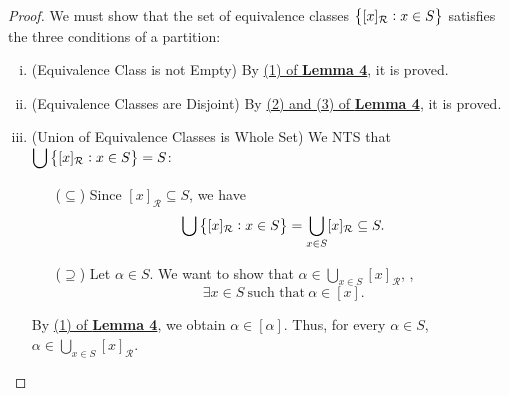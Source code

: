 \documentclass[11pt,openany]{article}
\begin{document}
\begin{proof}
	We must show that the set of equivalence classes $\set{[x]_{\mathcal{R}}:x\in S}$ satisfies the three conditions of a partition:
	\begin{enumerate}[(i)]
		\item (Equivalence Class is not Empty) By \hyperlink{lemma-4-1}{(1) of \textbf{Lemma 4}}, it is proved.
		\item (Equivalence Classes are Disjoint) By \hyperlink{lemma-4-2}{(2) and (3) of \textbf{Lemma 4}}, it is proved.
		\item (Union of Equivalence Classes is Whole Set) We NTS that $\displaystyle\bigcup\set{[x]_{\mathcal{R}}:x\in S}=S$:
		\begin{itemize}
			\item[($\subseteq$)] Since $[x]_{\mathcal{R}}\subseteq S$, we have \begin{align*}
				\bigcup\set{[x]_{\mathcal{R}}:x\in S}=\bigcup_{x\in S}[x]_{\mathcal{R}}\subseteq S.
			\end{align*}
			\item[($\supseteq$)] Let $\alpha\in S$. We want to show that $\displaystyle\alpha\in\bigcup_{x\in S}[x]_{\mathcal{R}}$, \ie, \[
			\exists x\in S\ \text{such that}\ \alpha\in[x].
			\]
		\end{itemize} By \hyperlink{lemma-4-1}{(1) of \textbf{Lemma 4}}, we obtain $\alpha\in[\alpha]$. Thus, for every $\alpha\in S$, $\displaystyle\alpha\in\bigcup_{x\in S}[x]_{\mathcal{R}}$.
	\end{enumerate}
\end{proof}
%	
%	
%	
\newpage
{}
\end{document}
